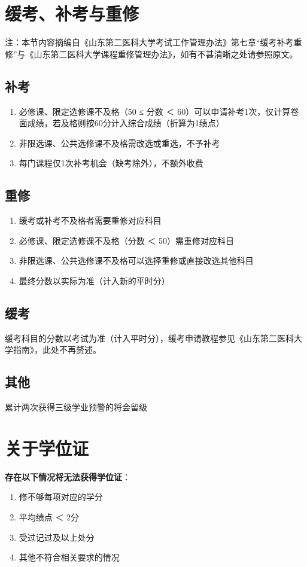 \section[缓考、补考与重修]{缓考、补考与重修}
\label{retake}
注：本节内容摘编自《山东第二医科大学考试工作管理办法》第七章“缓考补考重修”与《山东第二医科大学课程重修管理办法》，如有不甚清晰之处请参照原文。

\subsection[补考]{补考}
\begin{enumerate}
    \item 必修课、限定选修课不及格（50 ≤ 分数 ＜ 60）可以申请补考1次，仅计算卷面成绩，若及格则按60分计入综合成绩（折算为1绩点）
    \item 非限选课、公共选修课不及格需改选或重选，不予补考
    \item 每门课程仅1次补考机会（缺考除外），不额外收费
\end{enumerate}

\subsection[重修]{重修}
\begin{enumerate}
    \item 缓考或补考不及格者需要重修对应科目
    \item 必修课、限定选修课不及格（分数 ＜ 50）需重修对应科目
    \item 非限选课、公共选修课不及格可以选择重修或直接改选其他科目
    \item 最终分数以实际为准（计入新的平时分）
\end{enumerate}

\subsection[缓考]{缓考}
缓考科目的分数以考试为准（计入平时分），缓考申请教程参见《山东第二医科大学指南》，此处不再赘述。

\subsection[其他]{其他}
累计两次获得三级学业预警的将会留级

\section[关于学位证]{关于学位证}
\textbf{存在以下情况将无法获得学位证}：
\begin{enumerate}
    \item 修不够每项对应的学分
    \item 平均绩点 ＜ 2分
    \item 受过记过及以上处分
    \item 其他不符合相关要求的情况
\end{enumerate}


